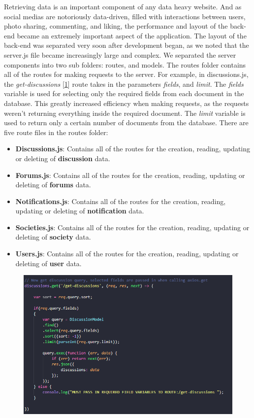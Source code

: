 Retrieving data is an important component of any data heavy website. And as social medias are notoriously data-driven, filled with interactions between users, photo sharing, commenting, and liking, the performance and layout of the back-end became an extremely important aspect of the application. The layout of the back-end was separated very soon after development began, as we noted that the server.js file became increasingly large and complex. We separated the server components into two sub folders: routes, and models. The routes folder contains all of the routes for making requests to the server. For example, in discussions.js, the \textit{get-discussions} [\ref{fig:Get Discussions Route}] route takes in the parameters \textit{fields}, and \textit{limit}. The \textit{fields} variable is used for selecting only the required fields from each document in the database. This greatly increased efficiency when making requests, as the requests weren't returning everything inside the required document. The \textit{limit} variable is used to return only a certain number of documents from the database. There are five route files in the routes folder:

\begin{itemize}
    \item \textbf{Discussions.js}: Contains all of the routes for the creation, reading, updating or deleting of \textbf{discussion} data.
    \item \textbf{Forums.js}: Contains all of the routes for the creation, reading, updating or deleting of \textbf{forums} data.
    \item \textbf{Notifications.js}: Contains all of the routes for the creation, reading, updating or deleting of \textbf{notification} data.
    \item \textbf{Societies.js}: Contains all of the routes for the creation, reading, updating or deleting of \textbf{society} data.
    \item \textbf{Users.js}: Contains all of the routes for the creation, reading, updating or deleting of \textbf{user} data.
\end{itemize}

\begin{figure}[H]
  \centering
  \includegraphics[scale=0.5]{img/get-discussions.jpg}
  \label{fig:Get Discussions Route}
\end{figure}

